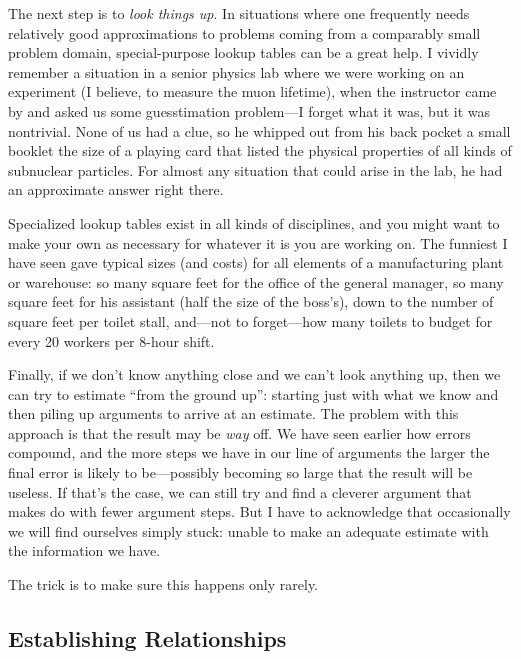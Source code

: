 The next step is to \emph{look things up}.  In situations where one
frequently needs relatively good approximations to problems coming
from a comparably small problem domain, special-purpose lookup tables
can be a great help. I vividly remember a situation in a senior
physics lab where we were working on an experiment (I believe, to
measure the muon lifetime), when the instructor came by and asked us
some guesstimation problem---I forget what it was, but it was
nontrivial. None of us had a clue, so he whipped out from his back
pocket a small booklet the size of a playing card that listed the
physical properties of all kinds of subnuclear particles. For almost
any situation that could arise in the lab, he had an approximate
answer right there.
    
Specialized lookup tables exist in all kinds of disciplines, and you
might want to make your own as necessary for whatever it is you are
working on. The funniest I have seen gave typical sizes (and costs)
for all elements of a manufacturing plant or warehouse: so many square
feet for the office of the general manager, so many square feet for
his assistant (half the size of the boss's), down to the number of
square feet per toilet stall, and---not to forget---how many toilets
to budget for every 20 workers per 8-hour shift.

Finally, if we don't know anything close and we can't look anything
up, then we can try to estimate ``from the ground\vadjust{\pagebreak} up'': starting just
with what we know and then piling up arguments to arrive at an
estimate. The problem with this approach is that the result may be
\emph{way} off. We have seen earlier how errors compound, and the
more steps we have in our line of arguments the larger the final error
is likely to be---possibly becoming so large that the result will be
useless. If that's the case, we can still try and find a cleverer
argument that makes do with fewer argument steps. But I have to
acknowledge that occasionally we will find ourselves simply stuck:
unable to make an adequate estimate with the information we have.
    
The trick is to make sure this happens only rarely.

\subsection{Establishing Relationships}

     
